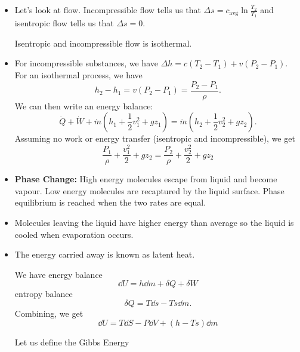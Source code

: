 \begin{itemize}
    \item Let's look at flow. Incompressible flow tells us that $\Delta s= c_\text{avg} \ln\frac{T_2}{T_1}$ and isentropic flow tells us that $\Delta s=0$.
    \begin{idea}
        Isentropic and incompressible flow is isothermal.
    \end{idea}
    \item For incompressible substances, we have $\Delta h= c(T_2-T_1)+v(P_2-P_1)$. For an isothermal process, we have 
    \begin{equation}
        h_2-h_1 = v(P_2-P_1) = \frac{P_2-P_1}{\rho}.
    \end{equation}
    We can then write an energy balance: 
    \begin{equation}
        \dot{Q} + \dot{W} + \dot{m}(h_1+\frac{1}{2}v_1^2+gz_1)=\dot{m}(h_2+\frac{1}{2}v_2^2+gz_2).
    \end{equation}
    Assuming no work or energy transfer (isentropic and incompressible), we get 
    \begin{equation}
        \frac{P_1}{\rho}+\frac{v_1^2}{2}+gz_2 = \frac{P_2}{\rho}+\frac{v_2^2}{2}+gz_2
    \end{equation}
    \item \textbf{Phase Change:} High energy molecules escape from liquid and become vapour. Low energy molecules are recaptured by the liquid surface. Phase equilibrium is reached when the two rates are equal.
    \item Molecules leaving the liquid have higher energy than average so the liquid is cooled when evaporation occurs.
    \item The energy carried away is known as latent heat.
    \begin{idea}
        We have energy balance 
        \begin{equation}
            \dd{U} = h\dd{m} + \delta Q + \delta W
        \end{equation}
        entropy balance 
        \begin{equation}
            \delta Q = T\dd{s} - Ts\dd{m}.
        \end{equation}
        Combining, we get
        \begin{equation}
            \dd{U} = T\dd{S}-P\dd{V} + (h-Ts)\dd{m}
        \end{equation}
    \end{idea}
    \begin{definition}
        Let us define the Gibbs Energy 
        \begin{equation}

\end{equation}
\end{definition}
\end{itemize}

